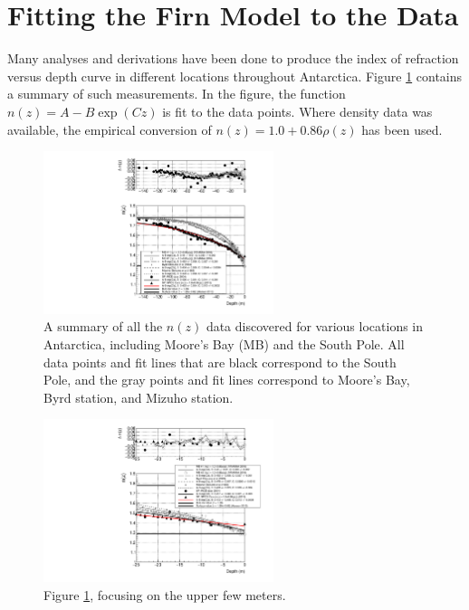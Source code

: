 \documentclass[12pt]{article}
\begin{document}
\section{Fitting the Firn Model to the Data}
\label{sec:fit}

Many analyses and derivations have been done to produce the index of refraction versus depth curve in different locations throughout Antarctica.  Figure \ref{fig:fig1} contains a summary of such measurements.  In the figure, the function $n(z) = A-B\exp(Cz)$ is fit to the data points.  Where density data was available, the empirical conversion of $n(z) = 1.0 + 0.86\rho(z)$ has been used.

\begin{figure}[ht]
\centering
\includegraphics[width=0.6\textwidth]{figures/January17_plot1.pdf}
\caption{\label{fig:fig1} A summary of all the $n(z)$ data discovered for various locations in Antarctica, including Moore's Bay (MB) and the South Pole.  All data points and fit lines that are black correspond to the South Pole, and the gray points and fit lines correspond to Moore's Bay, Byrd station, and Mizuho station.}
\end{figure}

\begin{figure}[ht]
\centering
\includegraphics[width=0.6\textwidth]{figures/January17_plot2.pdf}
\caption{\label{fig:fig1a} Figure \ref{fig:fig1}, focusing on the upper few meters.}
\end{figure}
\end{document}
